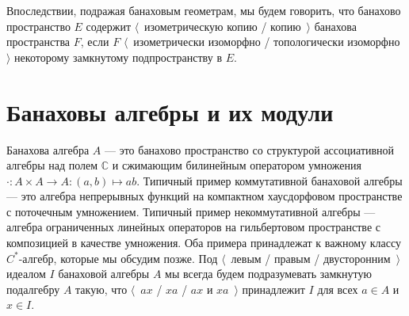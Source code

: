 Впоследствии, подражая банаховым геометрам, мы будем говорить, что банахово пространство $E$ содержит $\langle$~изометрическую копию / копию~$\rangle$ банахова пространства $F$, если $F$ $\langle$~изометрически изоморфно / топологически изоморфно~$\rangle$ некоторому замкнутому подпространству в $E$.


\section{Банаховы алгебры и их модули}
\label{SectionBanachAlgebrasAndTheirModules}

Банахова алгебра $A$ --- это банахово пространство со структурой ассоциативной алгебры над полем $\mathbb{C}$ и сжимающим билинейным оператором умножения $\cdot:A\times A\to A:(a,b)\mapsto ab$. Типичный пример коммутативной банаховой алгебры --- это алгебра непрерывных функций на компактном хаусдорфовом пространстве с поточечным умножением. Типичный пример некоммутативной алгебры --- алгебра ограниченных линейных операторов на гильбертовом пространстве с композицией в качестве умножения. Оба примера принадлежат к важному классу $C^*$-алгебр, которые мы обсудим позже. Под $\langle$~левым / правым / двусторонним~$\rangle$ идеалом $I$ банаховой алгебры $A$ мы всегда будем подразумевать замкнутую подалгебру $A$ такую, что $\langle$~$ax$ / $xa$ / $ax$ и $xa$~$\rangle$ принадлежит $I$ для всех $a\in A$ и $x\in I$.

